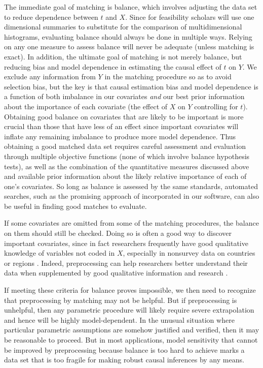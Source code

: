 \documentclass[11pt,titlepage]{article}
\begin{document}
The immediate goal of matching is balance, which involves adjusting
the data set to reduce dependence between $t$ and $X$.  Since for
feasibility scholars will use one dimensional summaries to substitute
for the comparison of multidimensional histograms, evaluating balance
should always be done in multiple ways.  Relying on any one measure to
assess balance will never be adequate (unless matching is exact).  In
addition, the ultimate goal of matching is not merely balance, but
reducing bias and model dependence in estimating the causal effect of
$t$ on $Y$.  We exclude any information from $Y$ in the matching
procedure so as to avoid selection bias, but the key is that causal
estimation bias and model dependence is a function of both imbalance
in our covariates \emph{and} our best prior information about the
importance of each covariate (the effect of $X$ on $Y$ controlling for
$t$).  Obtaining good balance on covariates that are likely to be
important is more crucial than those that have less of an effect since
important covariates will inflate any remaining imbalance to produce
more model dependence.  Thus obtaining a good matched data set
requires careful assessment and evaluation through multiple objective
functions (none of which involve balance hypothesis tests), as well as
the combination of the quantitative measures discussed above and
available prior information about the likely relative importance of
each of one's covariates.  So long as balance is assessed by the same
standards, automated searches, such as the promising approach of
\citet{DiaSek05} incorporated in our software, can also be useful in
finding good matches to evaluate.

If some covariates are omitted from some of the matching procedures,
the balance on them should still be checked.  Doing so is often a good
way to discover important covariates, since in fact researchers
frequently have good qualitative knowledge of variables not coded in
$X$, especially in nonsurvey data on countries or regions
\citep[][Ch.3]{Rosenbaum02}.  Indeed, preprocessing can help
researchers better understand their data when supplemented by good
qualitative information and research \citep[e.g.,][]{RosSil01}.

If meeting these criteria for balance proves impossible, we then need
to recognize that preprocessing by matching may not be helpful.  But
if preprocessing is unhelpful, then any parametric procedure will
likely require severe extrapolation and hence will be highly
model-dependent.  In the unusual situation where particular parametric
assumptions are somehow justified and verified, then it may be
reasonable to proceed.  But in most applications, model sensitivity
that cannot be improved by preprocessing because balance is too hard
to achieve marks a data set that is too fragile for making robust
causal inferences by any means.
\end{document}
